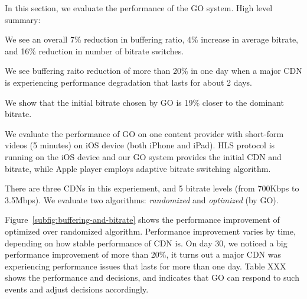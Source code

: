 




\label{sec:eval}

In this section, we evaluate the performance of the GO system. High level summary:
\begin{packedenumerate}
    \item We see an overall 7\% reduction in buffering ratio, 4\% increase in average bitrate, and 16\% reduction in number of bitrate switches.
    \item We see buffering raito reduction of more than 20\% in one day when a major CDN is experiencing performance degradation that lasts for about 2 days.
    \item We show that the initial bitrate chosen by GO is 19\% closer to the dominant bitrate.
\end{packedenumerate}


We evaluate the performance of GO on one content provider with short-form videos (5 minutes) on iOS device (both iPhone and iPad). 
HLS protocol is running on the iOS device and our GO system provides the initial CDN and bitrate, while Apple player employs adaptive 
bitrate switching algorithm. 

There are three CDNs in this experiement, and 5 bitrate levels (from 700Kbps to 3.5Mbps). We evaluate two algorithms: {\it randomized} 
and {\it optimized} (by GO).


Figure~\ref{subfig:buffering-and-bitrate} shows the performance improvement of optimized over randomized algorithm. Performance improvement varies by time,
depending on how stable performance of CDN is. On day 30, we noticed a big performance improvement of more than 20\%,
it turns out a major CDN was experiencing performance issues that lasts for more than one day. Table XXX shows the 
performance and decisions, and indicates that GO can respond to such events and adjust decisions accordingly.

